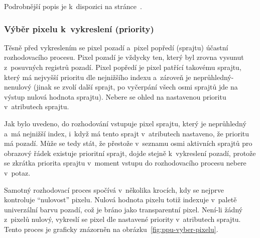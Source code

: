 Podrobnější popis je k~dispozici na stránce~\cite{Nesdev:ppu-sprites}.

\subsubsection{Výběr pixelu k~vykreslení (priority)}
\label{sec:ppu-priority}
Těsně před vykreslením se pixel pozadí a~pixel popředí (sprajtu) účastní rozhodovacího procesu. Pixel pozadí je vždycky ten, který byl zrovna vysunut z~posuvných registrů pozadí. Pixel popředí je pixel patřící takovému sprajtu, který má nejvyšší prioritu dle nejnižšího indexu a~zároveň je neprůhledný-nenulový (jinak se zvolí další sprajt, po vyčerpání všech osmi sprajtů jde na výstup nulová hodnota sprajtu). Nebere se ohled na nastavenou prioritu v~atributech sprajtu.

\begin{note}
	Jak bylo uvedeno, do rozhodování vstupuje pixel sprajtu, který je neprůhledný a~má nejnižší index, i~když má tento sprajt v~atributech nastaveno, že prioritu má pozadí. Může se tedy stát, že přestože v~seznamu osmi aktivních sprajtů pro obrazový řádek existuje prioritní sprajt, dojde stejně k~vykreslení pozadí, protože se zkrátka priorita sprajtu v~moment vstupu do rozhodovacího procesu nebere v~potaz.
\end{note}

Samotný rozhodovací proces spočívá v~několika krocích, kdy se nejprve kontroluje \enquote{nulovost} pixelu. Nulová hodnota pixelu totiž indexuje v~paletě univerzální barvu pozadí, což je bráno jako transparentní pixel. Není-li žádný z~pixelů nulový, vykreslí se pixel dle nastavené priority v~atributech sprajtu. Tento proces je graficky znázorněn na obrázku~\ref{fig:ppu-vyber-pixelu}.


